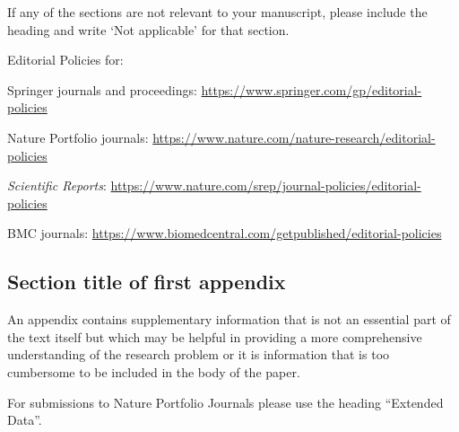 \documentclass[sn-vancouver,Numbered,pdflatex]{sn-jnl}
\theoremstyle{remark}
\theoremstyle{definition}
\begin{document}
\noindent If any of the sections are not relevant to your manuscript,
please include the heading and write `Not applicable' for that section.

\begin{flushleft}
Editorial Policies for:

\noindent Springer journals and proceedings:
\url{https://www.springer.com/gp/editorial-policies}

\noindent Nature Portfolio journals:
\url{https://www.nature.com/nature-research/editorial-policies}

\noindent \textit{Scientific Reports}:
\url{https://www.nature.com/srep/journal-policies/editorial-policies}

\noindent BMC journals:
\url{https://www.biomedcentral.com/getpublished/editorial-policies}

\end{flushleft}

\begin{appendices}

\hypertarget{secA1}{%
\section{Section title of first appendix}\label{secA1}}

An appendix contains supplementary information that is not an essential
part of the text itself but which may be helpful in providing a more
comprehensive understanding of the research problem or it is information
that is too cumbersome to be included in the body of the paper.

For submissions to Nature Portfolio Journals please use the heading
``Extended Data''.

\end{appendices}


\end{document}
